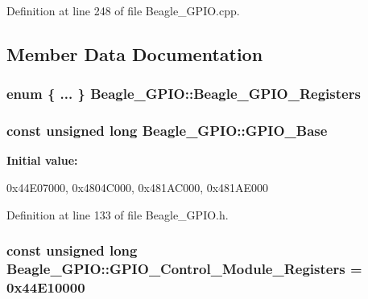 \-Definition at line 248 of file \-Beagle\-\_\-\-G\-P\-I\-O.\-cpp.



\subsection{\-Member \-Data \-Documentation}
\hypertarget{class_beagle___g_p_i_o_a0164dbfd9376ef3a1e0a404d5cf2f431}{
\subsubsection[{\-Beagle\-\_\-\-G\-P\-I\-O\-\_\-\-Registers}]{\setlength{\rightskip}{0pt plus 5cm}enum \{ ... \}   {\bf \-Beagle\-\_\-\-G\-P\-I\-O\-::\-Beagle\-\_\-\-G\-P\-I\-O\-\_\-\-Registers}}}\label{class_beagle___g_p_i_o_a0164dbfd9376ef3a1e0a404d5cf2f431}
\hypertarget{class_beagle___g_p_i_o_ab259232b938bf1892836737c07610384}{
\subsubsection[{\-G\-P\-I\-O\-\_\-\-Base}]{\setlength{\rightskip}{0pt plus 5cm}const unsigned long {\bf \-Beagle\-\_\-\-G\-P\-I\-O\-::\-G\-P\-I\-O\-\_\-\-Base}}}\label{class_beagle___g_p_i_o_ab259232b938bf1892836737c07610384}
{\bfseries \-Initial value\-:}
\begin{DoxyCode}
 
{
        0x44E07000,     
        0x4804C000,     
        0x481AC000,     
        0x481AE000      
}
\end{DoxyCode}


\-Definition at line 133 of file \-Beagle\-\_\-\-G\-P\-I\-O.\-h.

\hypertarget{class_beagle___g_p_i_o_a45dea13988842b47f592806fd15f1262}{
\subsubsection[{\-G\-P\-I\-O\-\_\-\-Control\-\_\-\-Module\-\_\-\-Registers}]{\setlength{\rightskip}{0pt plus 5cm}const unsigned long {\bf \-Beagle\-\_\-\-G\-P\-I\-O\-::\-G\-P\-I\-O\-\_\-\-Control\-\_\-\-Module\-\_\-\-Registers} = 0x44\-E10000}}\label{class_beagle___g_p_i_o_a45dea13988842b47f592806fd15f1262}


